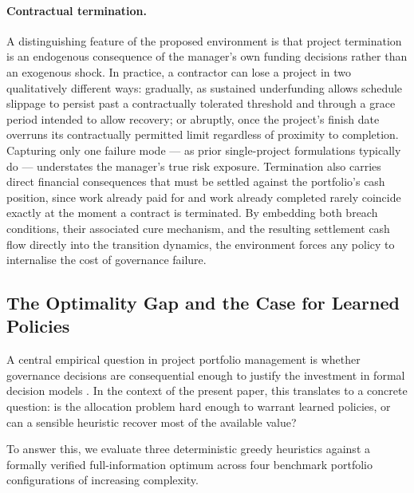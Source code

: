 \paragraph{Contractual termination.}
A distinguishing feature of the proposed environment is that project
termination is an endogenous consequence of the manager's own funding
decisions rather than an exogenous shock. In practice, a contractor
can lose a project in two qualitatively different ways: gradually, as
sustained underfunding allows schedule slippage to persist past a
contractually tolerated threshold and through a grace period intended
to allow recovery; or abruptly, once the project's finish date overruns
its contractually permitted limit regardless of proximity to completion.
Capturing only one failure mode --- as prior single-project formulations
typically do --- understates the manager's true risk exposure.
Termination also carries direct financial consequences that must be
settled against the portfolio's cash position, since work already paid
for and work already completed rarely coincide exactly at the moment a
contract is terminated. By embedding both breach conditions, their
associated cure mechanism, and the resulting settlement cash flow
directly into the transition dynamics, the environment forces any
policy to internalise the cost of governance failure.

\subsection{The Optimality Gap and the Case for Learned Policies}
\label{subsec:gap}

A central empirical question in project portfolio management is
whether governance decisions are consequential enough to justify the
investment in formal decision models \citep{Cooper2001, Turner2014}.
In the context of the present paper, this translates to a concrete
question: is the allocation problem hard enough to warrant learned
policies, or can a sensible heuristic recover most of the available
value?

To answer this, we evaluate three deterministic greedy heuristics
against a formally verified full-information optimum across four
benchmark portfolio configurations of increasing complexity.

